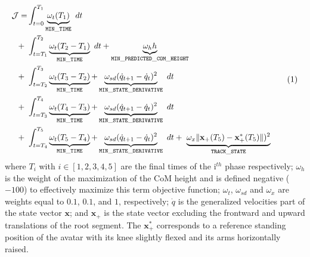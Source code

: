 \[ 
\resizebox{0.90\columnwidth}{!}{$ 
\begin{aligned}
\mathcal{J} = 
  &\int_{t=0}^{T_1}\underbrace{\omega_{t} (T_1)}_{\mathtt{MIN\_TIME}}~dt\\
  +~&\int_{t=T_1}^{T_2}\underbrace{\omega_{t} (T_2 - T_1)}_{\mathtt{MIN\_TIME}}~dt + \underbrace{\omega_h h}_{\mathtt{MIN\_PREDICTED\_COM\_HEIGHT}}\\
  +~&\int_{t=T_2}^{T_3}\underbrace{\omega_{t} (T_3 - T_2)}_{\mathtt{MIN\_TIME}} + \underbrace{\omega_{sd} (\dot{q}_{t+1} - \dot{q}_t)^2}_{\mathtt{MIN\_STATE\_DERIVATIVE}}~dt\\
  +~&\int_{t=T_3}^{T_4}\underbrace{\omega_{t} (T_4 - T_3)}_{\mathtt{MIN\_TIME}} + \underbrace{\omega_{sd} (\dot{q}_{t+1} - \dot{q}_t)^2}_{\mathtt{MIN\_STATE\_DERIVATIVE}}~dt\\
  +~&\int_{t=T_4}^{T_5}\underbrace{\omega_{t} (T_5 - T_4)}_{\mathtt{MIN\_TIME}} + \underbrace{\omega_{sd} (\dot{q}_{t+1} - \dot{q}_t)^2}_{\mathtt{MIN\_STATE\_DERIVATIVE}}~dt +~\underbrace{\omega_{x} \| \mathbf{x}_+(T_5) - \mathbf{x}_+^*(T_5)\| )^2}_{\mathtt{TRACK\_STATE}}\\
\end{aligned} 
$}  
\addtag  
\label{eq:cost_jumper}
\]
where $T_i$ with $i \in [1, 2, 3, 4, 5]$ are the final times of the i$^{th}$ phase respectively; 
$\omega_h$ is the weight of the maximization of the CoM height and is defined negative ($-100$) to effectively maximize this term objective function; 
$\omega_t$, $\omega_{sd}$ and $\omega_x$ are weights equal to $0.1$, $0.1$, and $1$, respectively; 
$\dot{q}$ is the generalized velocities part of the state vector $\mathbf{x}$; 
and $\mathbf{x}_+$ is the state vector excluding the frontward and upward translations of the root segment. 
The $\mathbf{x}_+^*$ corresponds to a reference standing position of the avatar with its knee slightly flexed and its arms horizontally raised.



